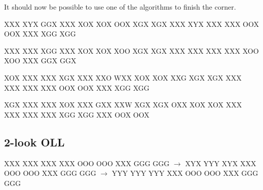 \documentclass[9pt,dvipsnames]{extarticle}
\begin{document}
\begin{multicols*}{4}
It should now be possible to use one of the algorithms to finish the corner.

\noindent%
\RubikFaceUp
{X}{X}{X}
{X}{Y}{X}
{G}{G}{X}%
\RubikFaceRight
{X}{X}{X}
{X}{O}{X}
{X}{O}{X}%
\RubikFaceFront
{O}{O}{X}
{X}{G}{X}
{X}{G}{X}%
\ShowCube{\cubesize}{\cubescale}{\DrawRubikCube}%
%
\RubikFaceUp
{X}{X}{X}
{X}{Y}{X}
{X}{X}{X}%
\RubikFaceRight
{X}{X}{X}
{O}{O}{X}
{O}{O}{X}%
\RubikFaceFront
{X}{X}{X}
{X}{G}{G}
{X}{G}{G}%
\ShowCube{\cubesize}{\cubescale}{\DrawRubikCubeRU}

\noindent%
\RubikFaceUp
{X}{X}{X}
{X}{X}{X}
{X}{G}{G}%
\RubikFaceLeft
{X}{X}{X}
{X}{O}{X}
{X}{O}{X}%
\RubikFaceFront
{X}{O}{O}
{X}{G}{X}
{X}{G}{X}%
\ShowCube{\cubesize}{\cubescale}{\DrawRubikCubeLU}%
%
\RubikFaceUp
{X}{X}{X}
{X}{X}{X}
{X}{X}{X}%
\RubikFaceLeft
{X}{X}{X}
{X}{O}{O}
{X}{O}{O}%
\RubikFaceFront
{X}{X}{X}
{G}{G}{X}
{G}{G}{X}%
\ShowCube{\cubesize}{\cubescale}{\DrawRubikCubeLU}

\noindent%
\RubikFaceBack
{X}{O}{X}
{X}{X}{X}
{X}{X}{X}%
\RubikFaceUp
{X}{G}{X}
{X}{X}{X}
{X}{X}{O}%
\RubikFaceRight
{W}{X}{X}
{X}{O}{X}
{X}{O}{X}%
\RubikFaceFront
{X}{X}{G}
{X}{G}{X}
{X}{G}{X}%
%
%
\RubikFaceUp
{X}{X}{X}
{X}{X}{X}
{X}{X}{X}%
\RubikFaceRight
{X}{X}{X}
{O}{O}{X}
{O}{O}{X}%
\RubikFaceFront
{X}{X}{X}
{X}{G}{G}
{X}{G}{G}%
\ShowCube{\cubesize}{\cubescale}{\DrawRubikCubeRU}

\noindent%
\RubikFaceBack
{X}{G}{X}
{X}{X}{X}
{X}{X}{X}%
\RubikFaceUp
{X}{O}{X}
{X}{X}{X}
{G}{X}{X}%
\RubikFaceLeft
{X}{X}{W}
{X}{G}{X}
{X}{G}{X}%
\RubikFaceFront
{O}{X}{X}
{X}{O}{X}
{X}{O}{X}%
%
%
\RubikFaceUp
{X}{X}{X}
{X}{X}{X}
{X}{X}{X}%
\RubikFaceLeft
{X}{X}{X}
{X}{G}{G}
{X}{G}{G}%
\RubikFaceFront
{X}{X}{X}
{O}{O}{X}
{O}{O}{X}%
\ShowCube{\cubesize}{\cubescale}{\DrawRubikCubeLU}%

\subsection*{2-look OLL}

\noindent%
\RubikFaceUp%
{X}{X}{X}
{X}{X}{X}
{X}{X}{X}%
\RubikFaceRight%
{X}{X}{X}
{O}{O}{O}
{O}{O}{O}%
\RubikFaceFront%
{X}{X}{X}
{G}{G}{G}
{G}{G}{G}%
\ShowCube{\cubesize}{\cubescale}{\DrawRubikCube}%
$\rightarrow$%
\noindent%
\RubikFaceUp%
{X}{Y}{X}
{Y}{Y}{Y}
{X}{Y}{X}%
\RubikFaceRight%
{X}{X}{X}
{O}{O}{O}
{O}{O}{O}%
\RubikFaceFront%
{X}{X}{X}
{G}{G}{G}
{G}{G}{G}%
\ShowCube{\cubesize}{\cubescale}{\DrawRubikCube}%
$\rightarrow$%
\RubikFaceUp%
{Y}{Y}{Y}
{Y}{Y}{Y}
{Y}{Y}{Y}%
\RubikFaceRight%
{X}{X}{X}
{O}{O}{O}
{O}{O}{O}%
\RubikFaceFront%
{X}{X}{X}
{G}{G}{G}
{G}{G}{G}%
\ShowCube{\cubesize}{\cubescale}{\DrawRubikCube}


\end{multicols*}
\end{document}
